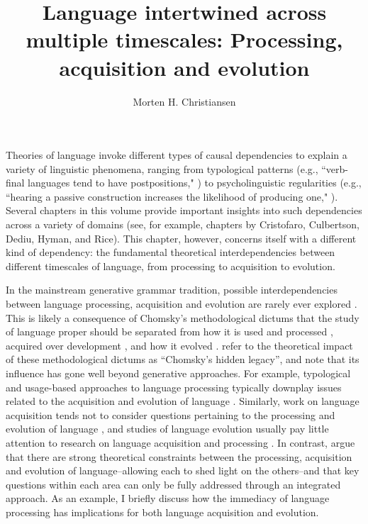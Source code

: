 \documentclass[output=paper]{langsci/langscibook}
\title{Language intertwined across multiple timescales: {Processing}, acquisition and evolution}
\author{Morten H. Christiansen\affiliation{Department of Psychology, Cornell University, Ithaca, NY, USA\newline Centre for Interacting Minds, Aarhus University, Denmark}}
\begin{document}
 
   
Theories of language invoke different types of causal dependencies to explain a variety of linguistic phenomena, ranging from typological patterns (e.g., ``verb-final languages tend to have postpositions," \citealt{Greenberg1966OrderMeaningfulElements}) to psycholinguistic regularities (e.g., ``hearing a passive construction increases the likelihood of producing one," \citealt{Bock1986}). Several chapters in this volume provide important insights into such dependencies across a variety of domains (see, for example, chapters by Cristofaro, Culbertson, Dediu, Hyman, and Rice). This chapter, however, concerns itself with a different kind of dependency: the fundamental theoretical interdependencies between different timescales of language, from processing to acquisition to evolution. 

In the mainstream generative grammar tradition, possible interdependencies between language processing, acquisition and evolution are rarely ever explored \citep[but see][]{Pinker1994,Jackendoff2002}. This is likely a consequence of Chomsky’s methodological dictums that the study of language proper should be separated from how it is used and processed \citep{Chomsky1965}, acquired over development \citep{Chomsky1975}, and how it evolved \citep{Chomsky2005}. \citet{Christiansen2016}  refer to the theoretical impact of these methodological dictums as “Chomsky’s hidden legacy”, and note that its influence has gone well beyond generative approaches. For example, typological and usage-based approaches to language processing typically downplay issues related to the acquisition and evolution of language \citep[e.g.,][]{Clark1996,Hawkins1994}. Similarly, work on language acquisition tends not to consider questions pertaining to the processing and evolution of language \citep[e.g.,][]{Cowie1999,Hirsh-Pasek1996,OGrady1997}, and studies of language evolution usually pay little attention to research on language acquisition and processing \citep[e.g.,][]{Botha2003,Burling2005,Corballis2002,Dunbar1998,Lieberman2000}. In contrast, \citet{Christiansen2016} argue that there are strong theoretical constraints between the processing, acquisition and evolution of language--allowing each to shed light on the others--and that key questions within each area can only be fully addressed through an integrated approach. As an example, I briefly discuss how the immediacy of language processing has implications for both language acquisition and evolution.   
\end{document}
